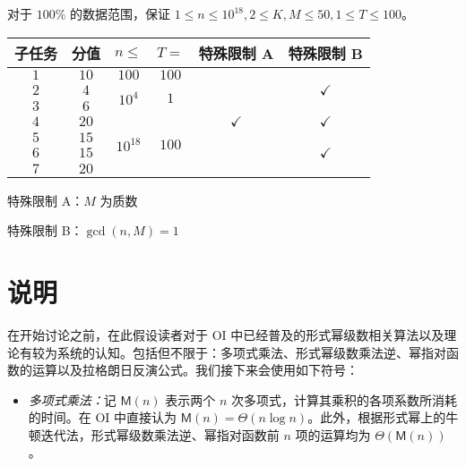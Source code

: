 \documentclass[12pt]{ctexart}
\newcommand{\Mul}{\ensuremath{\mathsf M}}
\theoremstyle{theorem}
\theoremstyle{theorem}
\begin{document}
对于 $100\%$ 的数据范围，保证 $1\le n\le 10^{18}, 2\le K, M\le 50, 1\le T\le 100$。

\newpage

\begin{table}[]
\centering
\begin{tabular}{|c|c|c|c|c|c|}
\hline
子任务 & 分值   & $n\le$                     & $T=$                   & 特殊限制 A            & 特殊限制 B       \\ \hline
$1$ & $10$ & $100$                      & $100$                  & \multirow{3}{*}{} &              \\ \cline{1-4} \cline{6-6} 
$2$ & $4$  & \multirow{2}{*}{$10^4$}    & \multirow{2}{*}{$1$}   &                   & $\checkmark$ \\ \cline{1-2} \cline{6-6} 
$3$ & $6$  &                            &                        &                   &              \\ \hline
$4$ & $20$ & \multirow{4}{*}{$10^{18}$} & \multirow{4}{*}{$100$} & $\checkmark$      & $\checkmark$ \\ \cline{1-2} \cline{5-6} 
$5$ & $15$ &                            &                        &                   &              \\ \cline{1-2} \cline{5-6} 
$6$ & $15$ &                            &                        & \multirow{2}{*}{} & $\checkmark$ \\ \cline{1-2} \cline{6-6} 
$7$ & $20$ &                            &                        &                   &              \\ \hline
\end{tabular}
\end{table}

特殊限制 A：$M$ 为质数

特殊限制 B：$\gcd(n,M)=1$

\newpage

\section{说明}

在开始讨论之前，在此假设读者对于 OI 中已经普及的形式幂级数相关算法以及理论有较为系统的认知。包括但不限于：多项式乘法、形式幂级数乘法逆、幂指对函数的运算以及拉格朗日反演公式。我们接下来会使用如下符号：

\begin{itemize}
\item \emph{多项式乘法：}记 $\Mul(n)$ 表示两个 $n$ 次多项式，计算其乘积的各项系数所消耗的时间。在 OI 中直接认为 $\Mul(n) = \Theta(n\log n)$。此外，根据形式幂上的牛顿迭代法，形式幂级数乘法逆、幂指对函数前 $n$ 项的运算均为 $\Theta(\Mul(n))$。
\end{itemize}
\end{document}
